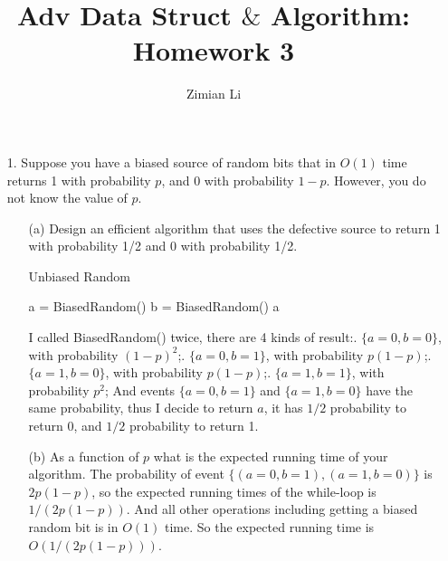 \documentclass{article}       %
\title{Adv Data Struct $\&$ Algorithm: Homework 3}
\author{Zimian Li}
\begin{document}
        
\maketitle

\begin{enumerate}
        \item[1.] Suppose you have a biased source of random bits that in $O(1)$ time returns 1 with probability $p$, and 0 with probability $1-p$. However, you do not know the value of $p$.
        \begin{enumerate}
        	\item[(a)] Design an efficient algorithm that uses the defective source to return 1 with probability 1/2 and 0 with probability 1/2.
        	\begin{algorithm}[H]
        		\caption{Unbiased Random}
        		\small
        		\begin{algorithmic}[1]
        			\State a = BiasedRandom()
        			\State b = BiasedRandom()
        			\State \Return a
        			\EndIf
        			\EndWhile
        			\EndProcedure
        		\end{algorithmic}\label{p1}
        	\end{algorithm}	
        	I called BiasedRandom() twice, there are 4 kinds of result:. $\{a=0, b=0\}$, with probability $(1-p)^2$;. $\{a=0, b=1\}$, with probability $p(1-p)$;. $\{a=1, b=0\}$, with probability $p(1-p)$;. $\{a=1, b=1\}$, with probability $p^2$;\newline
        	And events $\{a=0, b=1\}$ and $\{a=1, b=0\}$ have the same probability, thus I decide to return $a$, it has $1/2$ probability to return 0, and $1/2$ probability to return 1.\newline
        	\item[(b)] As a function of $p$ what is the expected running time of your algorithm.\newline\newline
        	The probability of event $\{(a=0, b=1), (a=1, b=0)\}$ is $2p(1-p)$, so the expected running times of the while-loop is $1/(2p(1-p))$. And all other operations including getting a biased random bit is in $O(1)$ time. So the expected running time is $O(1/(2p(1-p)))$.\newline

\end{enumerate}
\end{enumerate}
\end{document}
